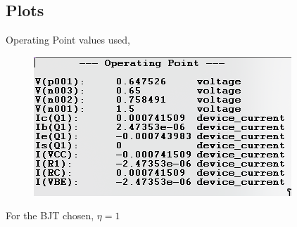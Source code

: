 \documentclass{article}
\begin{document}
\subsection{Plots}
Operating Point values used,
\begin{figure}[h!]
        \centering
        \includegraphics[width=0.7\linewidth]{figs/bjt_op_new.png}
    \end{figure}
For the BJT chosen, $\eta=1$
\pagebreak
\end{document}
